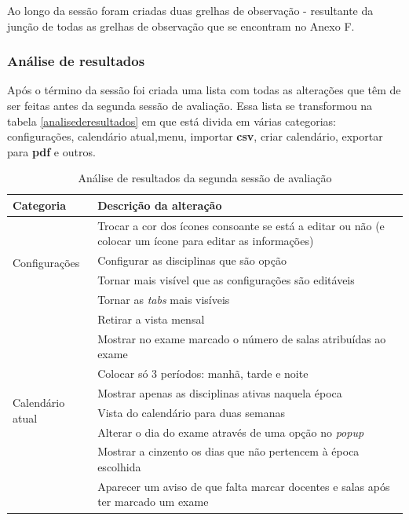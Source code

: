 \documentclass[11pt, twoside]{report}
\begin{document}
	Ao longo da sessão foram criadas duas grelhas de observação - resultante da junção de todas as grelhas de observação que se encontram no Anexo F.
	
	
	\subsubsection{Análise de resultados}
	
	Após o término da sessão foi criada uma lista com todas as alterações que têm de ser feitas antes da segunda sessão de avaliação.
	Essa lista se transformou na tabela \ref{analisederesultados} em que está divida em várias categorias: configurações, calendário atual,menu, importar \textbf{csv}, criar calendário, exportar para \textbf{pdf} e outros.
	

	\begin{center}
		\label{analisederesultados}
		\begin{longtable}{|m{2.2cm}|m{12cm}|}
			\caption{Análise de resultados da segunda sessão de avaliação}\\
			
			\hline			
			 \textbf{Categoria}&\textbf{Descrição da alteração} \\
			\hline
			
			\multirow{4}{2cm}{Configurações}& Trocar a cor dos ícones consoante se está a editar ou não (e colocar um ícone para editar as informações) \\
			
			& Configurar as disciplinas que são opção \\
			
			&Tornar mais visível que as configurações são editáveis \\
			
			&Tornar as \textit{tabs} mais visíveis\\
			
			\hline
			\multirow{8}{2cm}{Calendário atual}& Retirar a vista mensal \\
			& Mostrar no exame marcado o número de salas atribuídas ao exame\\
			& Colocar só 3 períodos: manhã, tarde e noite\\
			& Mostrar apenas as disciplinas ativas naquela época\\
			& Vista do calendário para duas semanas\\
			&Alterar o dia do exame através de uma opção no \textit{popup}\\
			&Mostrar a cinzento os dias que não pertencem à época escolhida\\
			&Aparecer um aviso de que falta marcar docentes e salas após ter marcado um exame\\
			

\end{longtable}
\end{center}
\end{document}
